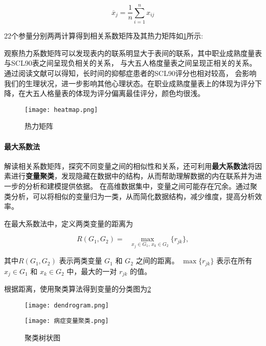 \documentclass[withoutpreface,bwprint]{cumcmthesis} %
\begin{document}
\begin{equation}
\overline{x}_j = \frac{1}{n} \sum_{i=1}^n x_{ij}
\end{equation}

22个参量分别两两计算得到相关系数矩阵及其热力矩阵如\cref{fig:heatmap}所示:

观察热力系数矩阵可以发现表内的联系明显大于表间的联系，其中职业成熟度量表与SCL90表之间呈现负相关的关系，
与大五人格度量表之间呈现正相关的关系。通过阅读文献\cite{Chi-Square Test}可以得知，长时间的抑郁症患者的SCL90评分也相对较高，
会影响我们的生理状况，进一步影响其他心理状态。在职业成熟度量表上的体现为评分下降，在大五人格量表的体现为评分偏离最佳评分，颜色均很浅。


\begin{figure}
    \centering
    \begin{minipage}[c]{0.8\textwidth}
        \centering
        \texttt{[image: heatmap.png]}
    \end{minipage}
    \caption{热力矩阵}
    \label{fig:heatmap}
\end{figure}
\paragraph*{最大系数法}解读相关系数矩阵，探究不同变量之间的相似性和关系，还可利用\textbf{最大系数法}将因素进行\textbf{变量聚类}，发现隐藏在数据中的结构，从而帮助理解数据的内在联系并为进一步的分析和建模提供依据。
在高维数据集中，变量之间可能存在冗余。通过聚类分析，可以将相似的变量归为一类，从而简化数据结构，减少维度，提高分析效率。

在最大系数法中，定义两类变量的距离为

\begin{equation}
    R(G_1, G_2) = \max_{\quad x_j \in G_1, \, x_k \in G_2} \{ r_{jk} \}, 
\end{equation}

其中\( R(G_1, G_2) \) 表示两类变量 \( G_1 \) 和 \( G_2 \) 之间的距离。
\( \max \{ r_{jk} \} \) 表示在所有 \( x_j \in G_1 \) 和 \( x_k \in G_2 \) 中，最大的一对 \( r_{jk} \) 的值。

根据距离，使用聚类算法得到变量的分类图为\cref{fig:dendrogram}

\begin{figure}
    \centering
    \begin{minipage}[c]{0.48\textwidth}
        \centering
        \texttt{[image: dendrogram.png]}
    \end{minipage}
    \begin{minipage}[c]{0.48\textwidth}
        \centering
        \texttt{[image: 病症变量聚类.png]}
    \end{minipage}
    \caption{聚类树状图}
    \label{fig:dendrogram}
\end{figure}
\end{document}

